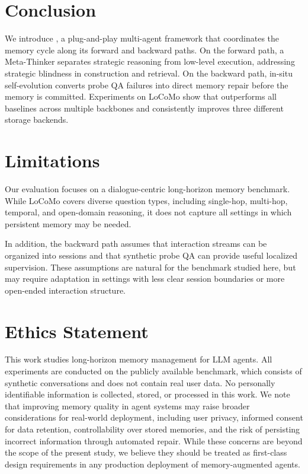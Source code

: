 \section{Conclusion}
We introduce \method, a plug-and-play multi-agent framework that 
coordinates the memory cycle along its forward and backward paths.
On the forward path, a Meta-Thinker separates strategic reasoning 
from low-level execution, addressing strategic blindness in 
construction and retrieval.
On the backward path, in-situ self-evolution converts probe QA 
failures into direct memory repair before the memory is committed.
Experiments on LoCoMo show that \method outperforms all baselines 
across multiple backbones and consistently improves three different 
storage backends.

\section{Limitations}
Our evaluation focuses on a dialogue-centric long-horizon memory benchmark.
While LoCoMo covers diverse question types, including single-hop, multi-hop, temporal, and open-domain reasoning, it does not capture all settings in which persistent memory may be needed.


In addition, the backward path assumes that interaction streams can be organized into sessions and that synthetic probe QA can provide useful localized supervision.
These assumptions are natural for the benchmark studied here, but may require adaptation in settings with less clear session boundaries or more open-ended interaction structure.

\section{Ethics Statement}
This work studies long-horizon memory management for LLM agents.
All experiments are conducted on the publicly available benchmark, which consists of synthetic conversations and does not contain real user data.
No personally identifiable information is collected, stored, or processed in this work.
We note that improving memory quality in agent systems may raise broader considerations for real-world deployment, including user privacy, informed consent for data retention, controllability over stored memories, and the risk of persisting incorrect information through automated repair.
While these concerns are beyond the scope of the present study, we believe they should be treated as first-class design requirements in any production deployment of memory-augmented agents.
